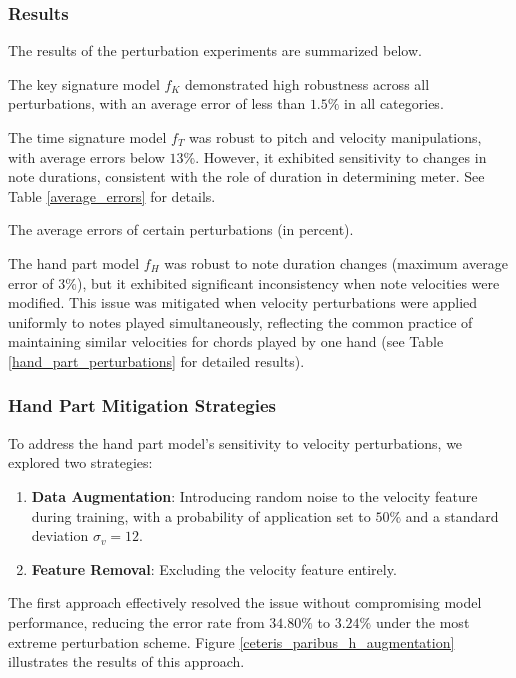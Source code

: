 \subsubsection{Results} \label{results}

The results of the perturbation experiments are summarized below.

The key signature model $f_K$ demonstrated high robustness across all perturbations, with an average error of less than $1.5\%$ in all categories.

The time signature model $f_T$ was robust to pitch and velocity manipulations, with average errors below $13\%$. However, it exhibited sensitivity to changes in note durations, consistent with the role of duration in determining meter. See Table \ref{average_errors} for details.

\begin{table}[ht!]

\caption[The average errors of certain perturbations (in percent).]{The average errors of certain perturbations (in percent).}
\label{average_errors}
\end{table}

The hand part model $f_H$ was robust to note duration changes (maximum average error of $3\%$), but it exhibited significant inconsistency when note velocities were modified. This issue was mitigated when velocity perturbations were applied uniformly to notes played simultaneously, reflecting the common practice of maintaining similar velocities for chords played by one hand (see Table \ref{hand_part_perturbations} for detailed results).

\subsubsection{Hand Part Mitigation Strategies}

To address the hand part model’s sensitivity to velocity perturbations, we explored two strategies: \begin{enumerate} \item \textbf{Data Augmentation}: Introducing random noise to the velocity feature during training, with a probability of application set to $50\%$ and a standard deviation $\sigma_v = 12$. \item \textbf{Feature Removal}: Excluding the velocity feature entirely. \end{enumerate}

The first approach effectively resolved the issue without compromising model performance, reducing the error rate from $34.80\%$ to $3.24\%$ under the most extreme perturbation scheme. Figure \ref{ceteris_paribus_h_augmentation} illustrates the results of this approach.

